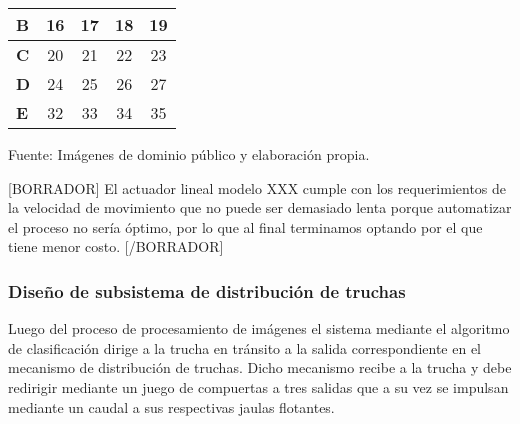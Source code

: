 \begin{mytable}[H]
\begin{tabular}{l|c|c|c|c|}
		\multicolumn{1}{|l|}{\textbf{B}}          & 16                                                                    & 17         & 18         & 19         \\ \hline
		\multicolumn{1}{|l|}{\textbf{C}}          & 20                                                                    & 21         & 22         & 23         \\ \hline
		\multicolumn{1}{|l|}{\textbf{D}}          & 24                                                                    & 25         & 26         & 27         \\ \hline
		\multicolumn{1}{|l|}{\textbf{E}}          & 32                                                                    & 33         & 34         & 35         \\ \hline
	\end{tabular}
	\begin{flushleft}	
		Fuente: Imágenes de dominio público y elaboración propia.
	\end{flushleft}
\end{mytable}

[BORRADOR] El actuador lineal modelo XXX cumple con los requerimientos de la velocidad de movimiento que no puede ser demasiado lenta porque automatizar el proceso no sería óptimo, por lo que al final terminamos optando por el que tiene menor costo. [/BORRADOR]


\subsubsection{Diseño de subsistema de distribución de truchas}

Luego del proceso de procesamiento de imágenes el sistema mediante el algoritmo de clasificación dirige a la trucha en tránsito a la salida correspondiente en el mecanismo de distribución de truchas. Dicho mecanismo recibe a la trucha y debe redirigir mediante un juego de compuertas a tres salidas que a su vez se impulsan mediante un caudal a sus respectivas jaulas flotantes.

